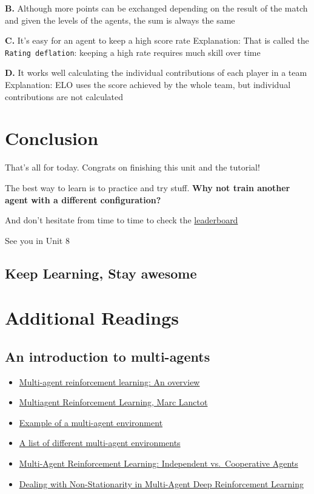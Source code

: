 \documentclass[11pt,a4paper]{article}
\begin{document}
\textbf{B.} Although more points can be exchanged depending on the result of the match and given the levels of the agents, the sum is always the same

\textbf{C.} It's easy for an agent to keep a high score rate Explanation: That is called the \texttt{Rating\ deflation}: keeping a high rate requires much skill over time

\textbf{D.} It works well calculating the individual contributions of each player in a team Explanation: ELO uses the score achieved by the whole team, but individual contributions are not calculated

\section{Conclusion}\label{conclusion}

That's all for today. Congrats on finishing this unit and the tutorial!

The best way to learn is to practice and try stuff. \textbf{Why not train another agent with a different configuration?}

And don't hesitate from time to time to check the \href{https://huggingface.co/spaces/huggingface-projects/AIvsAI-SoccerTwos}{leaderboard}

See you in Unit 8

\subsection{Keep Learning, Stay awesome}\label{keep-learning-stay-awesome}

\section{Additional Readings}\label{additional-readings}

\subsection{An introduction to multi-agents}\label{an-introduction-to-multi-agents}

\begin{itemize}
\tightlist
\item
  \href{https://www.dcsc.tudelft.nl/~bdeschutter/pub/rep/10_003.pdf}{Multi-agent reinforcement learning: An overview}
\item
  \href{https://rlss.inria.fr/files/2019/07/RLSS_Multiagent.pdf}{Multiagent Reinforcement Learning, Marc Lanctot}
\item
  \href{https://www.mathworks.com/help/reinforcement-learning/ug/train-3-agents-for-area-coverage.html?s_eid=PSM_15028}{Example of a multi-agent environment}
\item
  \href{https://agents.inf.ed.ac.uk/blog/multiagent-learning-environments/}{A list of different multi-agent environments}
\item
  \href{https://bit.ly/3nVK7My}{Multi-Agent Reinforcement Learning: Independent vs.~Cooperative Agents}
\item
  \href{https://bit.ly/3v7LxaT}{Dealing with Non-Stationarity in Multi-Agent Deep Reinforcement Learning}
\end{itemize}
\end{document}

